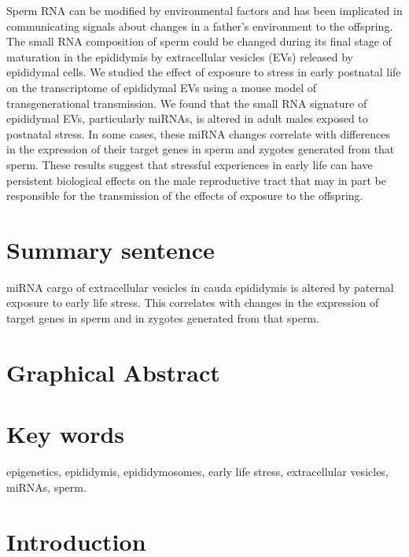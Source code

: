 \documentclass[12pt,twoside]{reedthesis}
\begin{document}
Sperm RNA can be modified by environmental factors and has been implicated in communicating signals about changes in a father's environment to the offspring. The small RNA composition of sperm could be changed during its final stage of maturation in the epididymis by extracellular vesicles (EVs) released by epididymal cells. We studied the effect of exposure to stress in early postnatal life on the transcriptome of epididymal EVs using a mouse model of transgenerational transmission. We found that the small RNA signature of epididymal EVs, particularly miRNAs, is altered in adult males exposed to postnatal stress. In some cases, these miRNA changes correlate with differences in the expression of their target genes in sperm and zygotes generated from that sperm. These results suggest that stressful experiences in early life can have persistent biological effects on the male reproductive tract that may in part be responsible for the transmission of the effects of exposure to the offspring.

\hypertarget{summary-sentence}{%
\section{Summary sentence}\label{summary-sentence}}

miRNA cargo of extracellular vesicles in cauda epididymis is altered by paternal exposure to early life stress. This correlates with changes in the expression of target genes in sperm and in zygotes generated from that sperm.

\newpage

\hypertarget{graphical-abstract-1}{%
\section{Graphical Abstract}\label{graphical-abstract-1}}

\hypertarget{key-words}{%
\section{Key words}\label{key-words}}

epigenetics, epididymis, epididymosomes, early life stress, extracellular vesicles, miRNAs, sperm.

\newpage

\hypertarget{introduction-1}{%
\section{Introduction}\label{introduction-1}}
\end{document}
